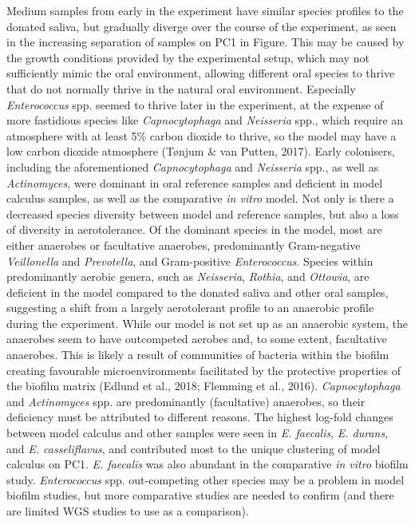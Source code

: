 \documentclass[
]{article}
\begin{document}
Medium samples from early in the experiment have similar species
profiles to the donated saliva, but gradually diverge over the course of
the experiment, as seen in the increasing separation of samples on PC1
in Figure. This may be caused by the growth conditions provided by the
experimental setup, which may not sufficiently mimic the oral
environment, allowing different oral species to thrive that do not
normally thrive in the natural oral environment. Especially
\emph{Enterococcus} spp. seemed to thrive later in the experiment, at
the expense of more fastidious species like \emph{Capnocytophaga} and
\emph{Neisseria} spp., which require an atmosphere with at least 5\%
carbon dioxide to thrive, so the model may have a low carbon dioxide
atmosphere (Tønjum \& van Putten, 2017). Early colonisers, including the
aforementioned \emph{Capnocytophaga} and \emph{Neisseria} spp., as well
as \emph{Actinomyces}, were dominant in oral reference samples and
deficient in model calculus samples, as well as the comparative \emph{in
vitro} model. Not only is there a decreased species diversity between
model and reference samples, but also a loss of diversity in
aerotolerance. Of the dominant species in the model, most are either
anaerobes or facultative anaerobes, predominantly Gram-negative
\emph{Veillonella} and \emph{Prevotella}, and Gram-positive
\emph{Enterococcus}. Species within predominantly aerobic genera, such
as \emph{Neisseria}, \emph{Rothia}, and \emph{Ottowia}, are deficient in
the model compared to the donated saliva and other oral samples,
suggesting a shift from a largely aerotolerant profile to an anaerobic
profile during the experiment. While our model is not set up as an
anaerobic system, the anaerobes seem to have outcompeted aerobes and, to
some extent, facultative anaerobes. This is likely a result of
communities of bacteria within the biofilm creating favourable
microenvironments facilitated by the protective properties of the
biofilm matrix (Edlund et al., 2018; Flemming et al., 2016).
\emph{Capnocytophaga} and \emph{Actinomyces} spp. are predominantly
(facultative) anaerobes, so their deficiency must be attributed to
different reasons. The highest log-fold changes between model calculus
and other samples were seen in \emph{E. faecalis}, \emph{E. durans}, and
\emph{E. casseliflavus}, and contributed most to the unique clustering
of model calculus on PC1. \emph{E. faecalis} was also abundant in the
comparative \emph{in vitro} biofilm study. \emph{Enterococcus} spp.
out-competing other species may be a problem in model biofilm studies,
but more comparative studies are needed to confirm (and there are
limited WGS studies to use as a comparison).
\end{document}

